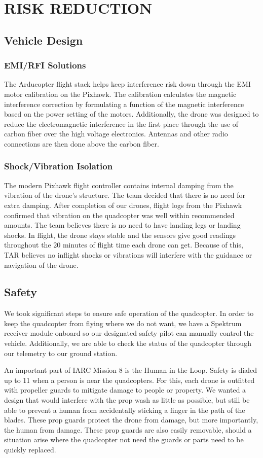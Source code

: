 \documentclass[12pt,letterpaper]{article}
\begin{document}
\section*{RISK REDUCTION}
	\subsection*{Vehicle Design}
		\subsubsection*{EMI/RFI Solutions}
			The Arducopter flight stack helps keep interference risk down through the EMI motor calibration on the Pixhawk. The calibration calculates the magnetic interference correction by formulating a function of the magnetic interference based on the power setting of the motors. Additionally, the drone was designed to reduce the electromagnetic interference in the first place through the use of carbon fiber over the high voltage electronics. Antennas and other radio connections are then done above the carbon fiber.

		\subsubsection*{Shock/Vibration Isolation}
			The modern Pixhawk flight controller contains internal damping from the vibration of the drone's structure. The team decided that there is no need for extra damping. After completion of our drones, flight logs from the Pixhawk confirmed that vibration on the quadcopter was well within recommended amounts. The team believes there is no need to have landing legs or landing shocks. In flight, the drone stays stable and the sensors give good readings throughout the 20 minutes of flight time each drone can get. Because of this, TAR believes no inflight shocks or vibrations will interfere with the guidance or navigation of the drone.


	\subsection*{Safety}
		We took significant steps to ensure safe operation of the quadcopter. In order to keep the quadcopter from flying where we do not want, we have a Spektrum receiver module onboard so our designated safety pilot can manually control the vehicle. Additionally, we are able to check the status of the quadcopter through our telemetry to our ground station.

		An important part of IARC Mission 8 is the Human in the Loop. Safety is dialed up to 11 when a person is near the quadcopters. For this, each drone is outfitted with propeller guards to mitigate damage to people or property. We wanted a design that would interfere with the prop wash as little as possible, but still be able to prevent a human from accidentally sticking a finger in the path of the blades. These prop guards protect the drone from damage, but more importantly, the human from damage. These prop guards are also easily removable, should a situation arise where the quadcopter not need the guards or parts need to be quickly replaced.
\end{document}
